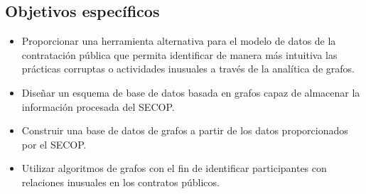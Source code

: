 \documentclass[11pt,letterpaper,oneside]{article}
\begin{document}
		\subsection{Objetivos específicos}
		\begin{itemize}
		\item Proporcionar una herramienta alternativa para el modelo de datos de la contratación pública que permita identificar de manera más intuitiva las prácticas corruptas o actividades inusuales a través de la analítica de grafos.
		\item Diseñar un esquema de base de datos basada en grafos capaz de almacenar la información procesada del SECOP.
		\item Construir una base de datos de grafos a partir de los datos proporcionados por el SECOP.
		\item Utilizar algoritmos de grafos con el fin de identificar participantes con relaciones inusuales en los contratos públicos.
		\end{itemize}
	
	

	
\end{document}
